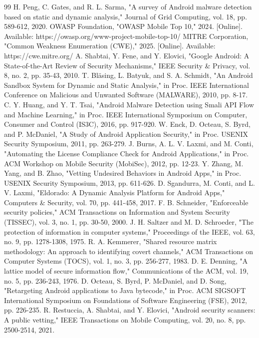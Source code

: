 \documentclass[conference]{
IEEEtran}
\begin{document}
\begin{thebibliography}{99}
 H. Peng, C. Gates, and R. L. Sarma, "A survey of Android malware detection based on static and dynamic analysis," Journal of Grid Computing, vol. 18, pp. 589-612, 2020.
 OWASP Foundation, "OWASP Mobile Top 10," 2024. [Online]. Available: https://owasp.org/www-project-mobile-top-10/
 MITRE Corporation, "Common Weakness Enumeration (CWE)," 2025. [Online]. Available: https://cwe.mitre.org/
 A. Shabtai, Y. Fene, and Y. Elovici, "Google Android: A State-of-the-Art Review of Security Mechanisms," IEEE Security & Privacy, vol. 8, no. 2, pp. 35-43, 2010.
 T. Bläsing, L. Batyuk, and S. A. Schmidt, "An Android Sandbox System for Dynamic and Static Analysis," in Proc. IEEE International Conference on Malicious and Unwanted Software (MALWARE), 2010, pp. 8-17.
 C. Y. Huang, and Y. T. Tsai, "Android Malware Detection using Smali API Flow and Machine Learning," in Proc. IEEE International Symposium on Computer, Consumer and Control (IS3C), 2016, pp. 917-920.
 W. Enck, D. Octeau, S. Byrd, and P. McDaniel, "A Study of Android Application Security," in Proc. USENIX Security Symposium, 2011, pp. 263-279.
 J. Burns, A. L. V. Laxmi, and M. Conti, "Automating the License Compliance Check for Android Applications," in Proc. ACM Workshop on Mobile Security (MobiSec), 2012, pp. 12-23.
 Y. Zhang, M. Yang, and B. Zhao, "Vetting Undesired Behaviors in Android Apps," in Proc. USENIX Security Symposium, 2013, pp. 611-626.
 D. Sgandurra, M. Conti, and L. V. Laxmi, "Eldorado: A Dynamic Analysis Platform for Android Apps," Computers & Security, vol. 70, pp. 441-458, 2017.
 F. B. Schneider, "Enforceable security policies," ACM Transactions on Information and System Security (TISSEC), vol. 3, no. 1, pp. 30-50, 2000.
 J. H. Saltzer and M. D. Schroeder, "The protection of information in computer systems," Proceedings of the IEEE, vol. 63, no. 9, pp. 1278-1308, 1975.
 R. A. Kemmerer, "Shared resource matrix methodology: An approach to identifying covert channels," ACM Transactions on Computer Systems (TOCS), vol. 1, no. 3, pp. 256-277, 1983.
 D. E. Denning, "A lattice model of secure information flow," Communications of the ACM, vol. 19, no. 5, pp. 236-243, 1976.
 D. Octeau, S. Byrd, P. McDaniel, and D. Song, "Retargeting Android applications to Java bytecode," in Proc. ACM SIGSOFT International Symposium on Foundations of Software Engineering (FSE), 2012, pp. 226-235.
 R. Restuccia, A. Shabtai, and Y. Elovici, "Android security scanners: A public vetting," IEEE Transactions on Mobile Computing, vol. 20, no. 8, pp. 2500-2514, 2021.

\end{thebibliography}
\end{document}
